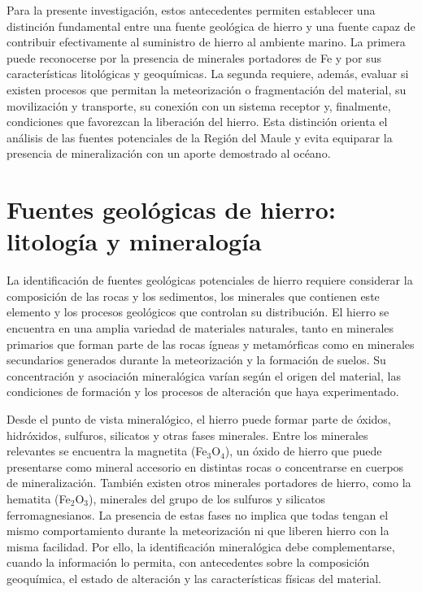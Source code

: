 Para la presente investigación, estos antecedentes permiten establecer una distinción fundamental entre una fuente geológica de hierro y una fuente capaz de contribuir efectivamente al suministro de hierro al ambiente marino. La primera puede reconocerse por la presencia de minerales portadores de Fe y por sus características litológicas y geoquímicas. La segunda requiere, además, evaluar si existen procesos que permitan la meteorización o fragmentación del material, su movilización y transporte, su conexión con un sistema receptor y, finalmente, condiciones que favorezcan la liberación del hierro. Esta distinción orienta el análisis de las fuentes potenciales de la Región del Maule y evita equiparar la presencia de mineralización con un aporte demostrado al océano.

\section{Fuentes geológicas de hierro: litología y mineralogía}

La identificación de fuentes geológicas potenciales de hierro requiere considerar la composición de las rocas y los sedimentos, los minerales que contienen este elemento y los procesos geológicos que controlan su distribución. El hierro se encuentra en una amplia variedad de materiales naturales, tanto en minerales primarios que forman parte de las rocas ígneas y metamórficas como en minerales secundarios generados durante la meteorización y la formación de suelos. Su concentración y asociación mineralógica varían según el origen del material, las condiciones de formación y los procesos de alteración que haya experimentado.

Desde el punto de vista mineralógico, el hierro puede formar parte de óxidos, hidróxidos, sulfuros, silicatos y otras fases minerales. Entre los minerales relevantes se encuentra la magnetita (Fe$_3$O$_4$), un óxido de hierro que puede presentarse como mineral accesorio en distintas rocas o concentrarse en cuerpos de mineralización. También existen otros minerales portadores de hierro, como la hematita (Fe$_2$O$_3$), minerales del grupo de los sulfuros y silicatos ferromagnesianos. La presencia de estas fases no implica que todas tengan el mismo comportamiento durante la meteorización ni que liberen hierro con la misma facilidad. Por ello, la identificación mineralógica debe complementarse, cuando la información lo permita, con antecedentes sobre la composición geoquímica, el estado de alteración y las características físicas del material.

